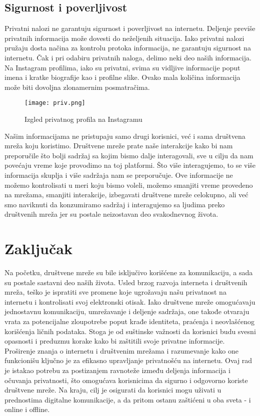 \documentclass[12pt, a4paper]{article}
\begin{document}
{\subsection{Sigurnost i poverljivost}

Privatni nalozi ne garantuju sigurnost i poverljivost na internetu. Deljenje previše privatnih informacija može dovesti do neželjenih situacija. Iako privatni nalozi pružaju dosta načina za kontrolu protoka informacija, ne garantuju sigurnost na internetu. Čak i pri odabiru privatnih naloga, delimo neki deo naših informacija.
Na Instagram profilima, iako su privatni, svima su vidljive informacije poput imena i kratke biografije kao i profilne slike. Ovako mala količina informacija može biti dovoljna zlonamernim posmatračima.


\begin{figure}[h!]
     \centering
     \texttt{[image: priv.png]}
     \label{fig:privatni profil}
     \caption{Izgled privatnog profila na Instagramu}
 \end{figure}

Našim informacijama ne pristupaju samo drugi korisnici, već i sama društvena mreža koju koristimo. Društvene mreže prate naše interakcije kako bi nam preporučile što bolji sadržaj sa kojim bismo dalje interagovali, sve u cilju da nam povećaju vreme koje provodimo na toj platformi. Što više interagujemo, to se više informacija skuplja i više sadržaja nam se preporučuje. 
Ove informacije ne možemo kontrolisati u meri koju bismo voleli, možemo smanjiti vreme provedeno na mrežama, smanjiti interakcije, izbegavati društvene mreže celokupno, ali već smo naviknuti da konzumiramo sadržaj i interagujemo sa ljudima preko društvenih mreža jer su postale neizostavan deo svakodnevnog života.



\section{Zaključak}
\label{sec:zakljucak}

Na početku, društvene mreže su bile isključivo korišćene za komunikaciju, a sada su postale sastavni deo naših života. Usled brzog razvoja interneta i društvenih mreža, teško je ispratiti sve promene koje ugrožavaju našu privatnost na internetu i kontrolisati svoj elektronski otisak. Iako društvene mreže omogućavaju jednostavnu komunikaciju, umrežavanje i deljenje sadržaja, one takođe otvaraju vrata za potencijalne zloupotrebe poput krađe identiteta, praćenja i neovlašćenog korišćenja ličnih podataka. Stoga je od suštinske važnosti da korisnici budu svesni opasnosti i preduzmu korake kako bi zaštitili svoje privatne informacije. Proširenje znanja o internetu i društvenim mrežama i razumevanje kako one funkcionišu ključno je za efikasno upravljanje privatnošću na internetu.
Ovaj rad je istakao potrebu za postizanjem ravnoteže između deljenja informacija i očuvanja privatnosti, što omogućava korisnicima da sigurno i odgovorno koriste društvene mreže. Na kraju, cilj je osigurati da korisnici mogu uživati u prednostima digitalne komunikacije, a da pritom ostanu zaštićeni u oba sveta - i online i offline.

}
\end{document}
